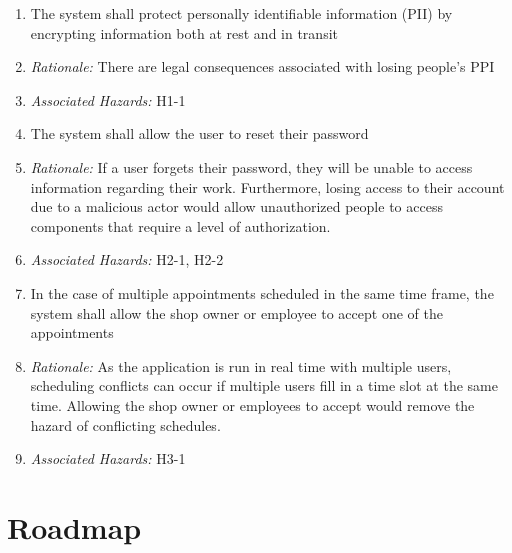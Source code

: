 \documentclass{article}
\begin{document}
\begin{enumerate}[label=SR\arabic*.]
	\item The system shall protect personally identifiable information (PII) by encrypting information both
	      at rest and in transit
	\item[] \emph{Rationale:} There are legal consequences associated with losing people's PPI
	\item[] \emph{Associated Hazards:} H1-1 \\
	\item The system shall allow the user to reset their password
	\item[] \emph{Rationale:} If a user forgets their password, they will be unable to access information
		regarding their work. Furthermore, losing access to their account due to a malicious actor would
		allow unauthorized people to access components that require a level of authorization.
	\item[] \emph{Associated Hazards:} H2-1, H2-2 \\
	\item In the case of multiple appointments scheduled in the same time frame, the system shall allow the
	      shop owner or employee to accept one of the appointments
	\item[] \emph{Rationale:} As the application is run in real time with multiple users, scheduling conflicts
		can occur if multiple users fill in a time slot at the same time. Allowing the shop owner or employees
		to accept would remove the hazard of conflicting schedules.
	\item[] \emph{Associated Hazards:} H3-1 \\
\end{enumerate}


\section{Roadmap}

\end{document}
